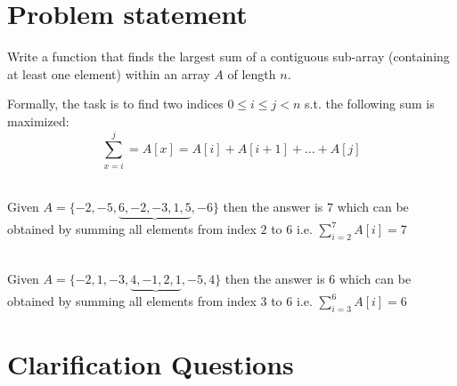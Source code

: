 \section{Problem statement}
\begin{exercise}
Write a function that finds the largest sum of a contiguous sub-array (containing at least one element) within an array $A$
of length $n$.

Formally, the task is to find two indices $ 0 \leq i \leq j < n$ s.t. the following sum is maximized:
\[
\sum_{x=i}^j   = A[x] = A[i] + A[i+1] + \ldots + A[j] 
\]

	\begin{example}
		\hfill \\
		Given $A=\{-2, -5, \underbrace{6, -2, -3, 1, 5}\text{}, -6\}$ then the answer is $7$ which can
		be obtained by summing all elements from index $2$ to $6$ i.e. $\sum_{i=2}^7 A[i] = 7$
	\end{example}

	\begin{example}
		\hfill \\
		Given $A=\{-2, 1, -3, \underbrace{4, -1, 2, 1}\text{}, -5, 4\}$ then the answer is $6$ which can
		be obtained by summing all elements from index $3$ to $6$ i.e. $\sum_{i=3}^6 A[i] = 6$
		
	\end{example}
\end{exercise}

\section{Clarification Questions}

